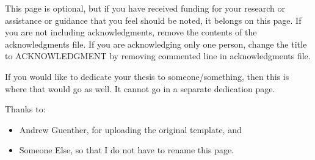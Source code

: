 
\begin{acknowledgments}

    This page is optional, but if you have received funding for your research or assistance or guidance that you feel should be noted, it belongs on this page. If you are not including acknowledgments, remove the contents of the acknowledgments file. If you are acknowledging only one person, change the title to ACKNOWLEDGMENT by removing commented line in acknowledgments file.

    If you would like to dedicate your thesis to someone/something, then this is where that would go as well. It cannot go in a separate dedication page.  %

    Thanks to:
    \begin{itemize}
        \item Andrew Guenther, for uploading the original template, and
        \item Someone Else, so that I do not have to rename this page.
    \end{itemize}
\end{acknowledgments}
